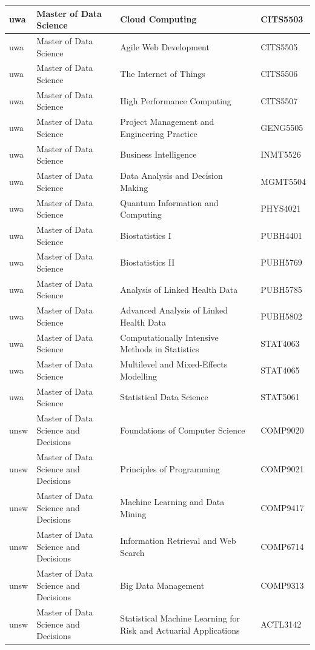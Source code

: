 \documentclass[
  letterpaper,
  DIV=11,
  numbers=noendperiod]{scrreport}
\begin{document}
\begin{table}
\begin{tabular}{l|l|l|l}
\hline
uwa & Master of Data Science & Cloud Computing & CITS5503\\
\hline
uwa & Master of Data Science & Agile Web Development & CITS5505\\
\hline
uwa & Master of Data Science & The Internet of Things & CITS5506\\
\hline
uwa & Master of Data Science & High Performance Computing & CITS5507\\
\hline
uwa & Master of Data Science & Project Management and Engineering Practice & GENG5505\\
\hline
uwa & Master of Data Science & Business Intelligence & INMT5526\\
\hline
uwa & Master of Data Science & Data Analysis and Decision Making & MGMT5504\\
\hline
uwa & Master of Data Science & Quantum Information and Computing & PHYS4021\\
\hline
uwa & Master of Data Science & Biostatistics I & PUBH4401\\
\hline
uwa & Master of Data Science & Biostatistics II & PUBH5769\\
\hline
uwa & Master of Data Science & Analysis of Linked Health Data & PUBH5785\\
\hline
uwa & Master of Data Science & Advanced Analysis of Linked Health Data & PUBH5802\\
\hline
uwa & Master of Data Science & Computationally Intensive Methods in Statistics & STAT4063\\
\hline
uwa & Master of Data Science & Multilevel and Mixed-Effects Modelling & STAT4065\\
\hline
uwa & Master of Data Science & Statistical Data Science & STAT5061\\
\hline
unsw & Master of Data Science and Decisions & Foundations of Computer Science & COMP9020\\
\hline
unsw & Master of Data Science and Decisions & Principles of Programming & COMP9021\\
\hline
unsw & Master of Data Science and Decisions & Machine Learning and Data Mining & COMP9417\\
\hline
unsw & Master of Data Science and Decisions & Information Retrieval and Web Search & COMP6714\\
\hline
unsw & Master of Data Science and Decisions & Big Data Management & COMP9313\\
\hline
unsw & Master of Data Science and Decisions & Statistical Machine Learning for Risk and Actuarial Applications & ACTL3142\\

\end{tabular}
\end{table}
\end{document}
